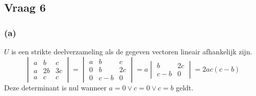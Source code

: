 \documentclass[lineaire_algebra_oplossingen.tex]{subfiles}
\begin{document}
\subsection{Vraag 6}
\subsubsection*{(a)}
$U$ is een strikte deelverzameling als de gegeven vectoren lineair afhankelijk zijn.
\[
\begin{vmatrix}
a & b & c\\
a & 2b & 3c\\
a & c & c
\end{vmatrix}
=
\begin{vmatrix}
a & b & c\\
0 & b & 2c\\
0 & c-b & 0
\end{vmatrix}
=
a
\begin{vmatrix}
b & 2c\\
c-b & 0
\end{vmatrix}
=
2ac(c-b)
\]
Deze determinant is nul wanneer $a=0\vee c=0\vee c=b$ geldt.
\end{document}
